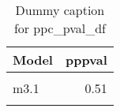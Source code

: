 \begin{table}
\centering
\caption{Dummy caption for ppc_pval_df}
\centering
\fontsize{10}{12}\selectfont
\begin{tabular}[t]{lr}
\toprule
Model & pppval\\
\midrule
\cellcolor{gray!10}{m2} & \cellcolor{gray!10}{0.48}\\
m3.1 & 0.51\\
\cellcolor{gray!10}{m4} & \cellcolor{gray!10}{0.49}\\
\bottomrule
\end{tabular}
\end{table}
